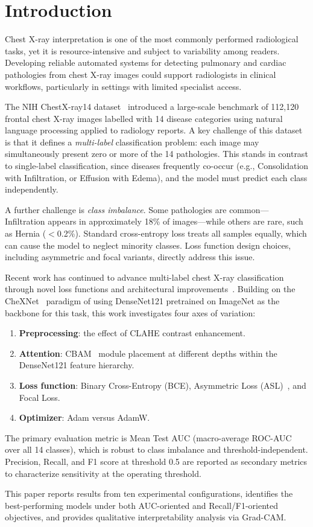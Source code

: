 \section{Introduction}

Chest X-ray interpretation is one of the most commonly performed radiological tasks, yet it is resource-intensive and subject to variability among readers.
Developing reliable automated systems for detecting pulmonary and cardiac pathologies from chest X-ray images could support radiologists in clinical workflows, particularly in settings with limited specialist access.

The NIH ChestX-ray14 dataset~\cite{wang2017chestxray14} introduced a large-scale benchmark of 112,120 frontal chest X-ray images labelled with 14 disease categories using natural language processing applied to radiology reports.
A key challenge of this dataset is that it defines a \emph{multi-label} classification problem: each image may simultaneously present zero or more of the 14 pathologies.
This stands in contrast to single-label classification, since diseases frequently co-occur (e.g., Consolidation with Infiltration, or Effusion with Edema), and the model must predict each class independently.

A further challenge is \emph{class imbalance}.
Some pathologies are common—Infiltration appears in approximately 18\% of images—while others are rare, such as Hernia ($<$0.2\%).
Standard cross-entropy loss treats all samples equally, which can cause the model to neglect minority classes.
Loss function design choices, including asymmetric and focal variants, directly address this issue.

Recent work has continued to advance multi-label chest X-ray classification through novel loss functions and architectural improvements~\cite{hanif2025enhancing}.
Building on the CheXNet~\cite{rajpurkar2017chexnet} paradigm of using DenseNet121 pretrained on ImageNet as the backbone for this task, this work investigates four axes of variation:

\begin{enumerate}
  \item \textbf{Preprocessing}: the effect of CLAHE contrast enhancement.
  \item \textbf{Attention}: CBAM~\cite{woo2018cbam} module placement at different depths within the DenseNet121 feature hierarchy.
  \item \textbf{Loss function}: Binary Cross-Entropy (BCE), Asymmetric Loss (ASL)~\cite{ridnik2021asl}, and Focal Loss.
  \item \textbf{Optimizer}: Adam versus AdamW.
\end{enumerate}

The primary evaluation metric is Mean Test AUC (macro-average ROC-AUC over all 14 classes), which is robust to class imbalance and threshold-independent.
Precision, Recall, and F1 score at threshold 0.5 are reported as secondary metrics to characterize sensitivity at the operating threshold.

This paper reports results from ten experimental configurations, identifies the best-performing models under both AUC-oriented and Recall/F1-oriented objectives, and provides qualitative interpretability analysis via Grad-CAM.
